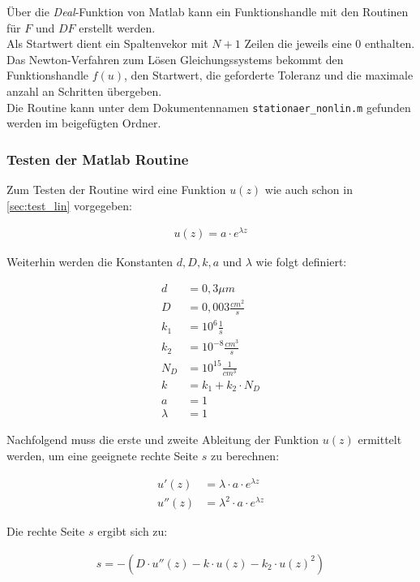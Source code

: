 \documentclass[
	pagesize,
	fontsize=12pt,
	paper=a4,
	oneside,
   reqno
]{scrartcl}
\begin{document}
Über die \textit{Deal}-Funktion von Matlab kann ein Funktionshandle mit den Routinen für $F$ und $DF$ erstellt werden.\\
Als Startwert dient ein Spaltenvekor mit $N+1$ Zeilen die jeweils eine $0$ enthalten.\\
Das Newton-Verfahren zum Lösen Gleichungssystems bekommt den Funktionshandle $f(u)$, den Startwert, die geforderte Toleranz und die maximale anzahl an Schritten übergeben.\\
Die Routine kann unter dem Dokumentennamen \texttt{stationaer\_nonlin.m} gefunden werden im beigefügten Ordner.

\subsubsection{Testen der Matlab Routine}

Zum Testen der Routine wird eine Funktion $u(z)$ wie auch schon in \autoref{sec:test_lin} vorgegeben:

\begin{align*}
   u(z) = a \cdot e^{\lambda z}
\end{align*}

Weiterhin werden die Konstanten $d, D, k, a$ und $\lambda$ wie folgt definiert:

\begin{align*}
   d &= 0,3\mu m \\
   D &= 0,003 \frac{cm^2}{s} \\
   k_1 &= 10^6 \frac{1}{s} \\
   k_2 &= 10^{-8} \frac{cm^3}{s} \\
   N_D &= 10^{15} \frac{1}{cm^3} \\
   k &= k_1 + k_2 \cdot N_D \\
   a &= 1 \\
   \lambda &= 1
\end{align*}

Nachfolgend muss die erste und zweite Ableitung der Funktion $u(z)$ ermittelt werden, um eine geeignete rechte Seite $s$ zu berechnen:

\begin{align*}
   u'(z) &= \lambda \cdot a \cdot e^{\lambda z} \\
   u''(z) &= \lambda^2 \cdot a \cdot e^{\lambda z}
\end{align*}

Die rechte Seite $s$ ergibt sich zu:

\begin{align*}
   s = -\left( D \cdot u''(z) - k \cdot u(z) - k_2 \cdot u(z)^2 \right)
\end{align*}
\end{document}
